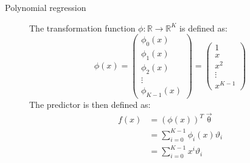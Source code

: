 \begin{description}
    \item[Polynomial regression] 
        The transformation function $\phi: \mathbb{R} \rightarrow \mathbb{R}^K$ is defined as:
        \[  
            \phi(x) = 
            \begin{pmatrix}
                \phi_0(x) \\ \phi_1(x) \\ \phi_2(x) \\ \vdots \\ \phi_{K-1}(x)
            \end{pmatrix}
            = 
            \begin{pmatrix}
                1 \\ x \\ x^2 \\ \vdots \\ x^{K-1}
            \end{pmatrix}
        \]
        The predictor is then defined as:
        \[ 
            \begin{split}
                f(x) &= (\phi(x))^T \vec{\uptheta} \\
                    &= \sum_{i=0}^{K-1} \phi_i(x)\vartheta_i \\
                    &= \sum_{i=0}^{K-1} x^i \vartheta_i
            \end{split}
        \]
\end{description}